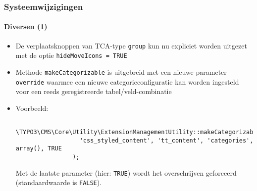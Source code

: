 \begin{frame}[fragile]
	\frametitle{Systeemwijzigingen}
	\framesubtitle{Diversen (1)}

	\begin{itemize}

		\item De verplaatsknoppen van TCA-type \texttt{group} kun nu expliciet worden uitgezet
			met de optie \texttt{hideMoveIcons = TRUE}

		\item Methode \texttt{makeCategorizable} is uitgebreid met een nieuwe parameter
			\texttt{override} waarmee een nieuwe categorieconfiguratie kan worden ingesteld
			voor een reeds geregistreerde tabel/veld-combinatie

		\item Voorbeeld:

			\begin{lstlisting}
				\TYPO3\CMS\Core\Utility\ExtensionManagementUtility::makeCategorizable(
				  'css_styled_content', 'tt_content', 'categories', array(), TRUE
				);
			\end{lstlisting}

			\small
				Met de laatste parameter (hier: \texttt{TRUE}) wordt het overschrijven geforceerd
				(standaardwaarde is \texttt{FALSE}).
			\normalsize

	\end{itemize}

\end{frame}


